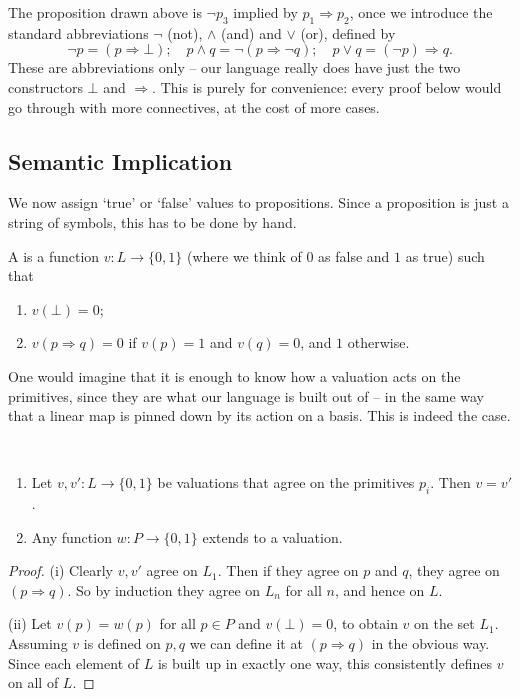 The proposition drawn above is $\lnot p_3$ implied by $p_1 \Rightarrow p_2$, once we introduce the standard abbreviations $\lnot$ (not), $\land$ (and) and $\lor$ (or), defined by
$$
\lnot p = (p \Rightarrow \bot); \quad p \land q = \lnot(p \Rightarrow \lnot q); \quad p \lor q = (\lnot p) \Rightarrow q.
$$
These are abbreviations only -- our language really does have just the two constructors $\bot$ and $\Rightarrow$. This is purely for convenience: every proof below would go through with more connectives, at the cost of more cases.

\subsection{Semantic Implication}

We now assign `true' or `false' values to propositions. Since a proposition is just a string of symbols, this has to be done by hand.

\begin{definition}[Valuation]
  A  is a function $v : L \rightarrow \{0, 1\}$ (where we think of $0$ as false and $1$ as true) such that
  \begin{enumerate}[label=(\roman*)]
    \item $v(\bot) = 0$;
    \item $v(p \Rightarrow q) = 0$ if $v(p) = 1$ and $v(q) = 0$, and $1$ otherwise.
  \end{enumerate}
\end{definition}

One would imagine that it is enough to know how a valuation acts on the primitives, since they are what our language is built out of -- in the same way that a linear map is pinned down by its action on a basis. This is indeed the case.

\begin{proposition}~
  \begin{enumerate}[label=(\roman*)]
    \item Let $v, v' : L \rightarrow \{0, 1\}$ be valuations that agree on the primitives $p_i$. Then $v = v'$.
    \item Any function $w: P \rightarrow \{0, 1\}$ extends to a valuation.
  \end{enumerate}
\end{proposition}
\begin{proof}
  (i) Clearly $v, v'$ agree on $L_1$. Then if they agree on $p$ and $q$, they agree on $(p \Rightarrow q)$. So by induction they agree on $L_n$ for all $n$, and hence on $L$.

  (ii) Let $v(p) = w(p)$ for all $p \in P$ and $v(\bot) = 0$, to obtain $v$ on the set $L_1$. Assuming $v$ is defined on $p, q$ we can define it at $(p\Rightarrow q)$ in the obvious way. Since each element of $L$ is built up in exactly one way, this consistently defines $v$ on all of $L$.
\end{proof}

